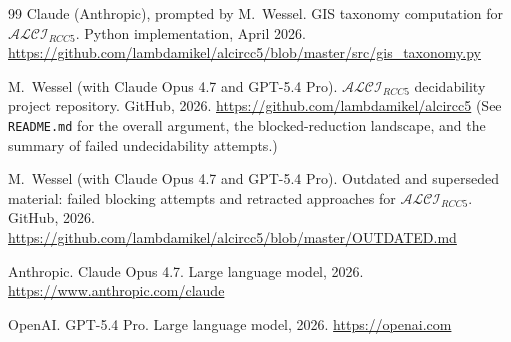 \documentclass[
]{ceurart}
\theoremstyle{definition}
\newcommand{\ALCIRCC}[1]{\ensuremath{\mathcal{ALCI}_{\mathit{RCC#1}}}}
\begin{document}
\begin{thebibliography}{99}
Claude (Anthropic), prompted by M.\ Wessel.
\newblock GIS taxonomy computation for $\ALCIRCC{5}$.
\newblock Python implementation, April 2026.
\newblock \url{https://github.com/lambdamikel/alcircc5/blob/master/src/gis_taxonomy.py}


M.\ Wessel (with Claude Opus 4.7 and GPT-5.4 Pro).
\newblock $\ALCIRCC{5}$ decidability project repository.
\newblock GitHub, 2026.
\newblock \url{https://github.com/lambdamikel/alcircc5}
\newblock (See \texttt{README.md} for the overall argument, the
  blocked-reduction landscape, and the summary of failed
  undecidability attempts.)

M.\ Wessel (with Claude Opus 4.7 and GPT-5.4 Pro).
\newblock Outdated and superseded material: failed blocking
  attempts and retracted approaches for $\ALCIRCC{5}$.
\newblock GitHub, 2026.
\newblock \url{https://github.com/lambdamikel/alcircc5/blob/master/OUTDATED.md}


Anthropic.
\newblock Claude Opus 4.7.
\newblock Large language model, 2026.
\newblock \url{https://www.anthropic.com/claude}

OpenAI.
\newblock GPT-5.4 Pro.
\newblock Large language model, 2026.
\newblock \url{https://openai.com}

\end{thebibliography}
\end{document}
